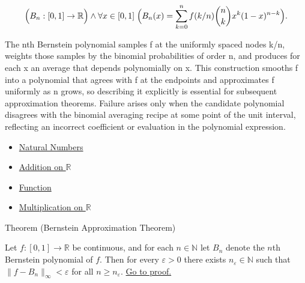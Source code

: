 \begin{remark*}
\[
\Bigl(B_n:[0,1]\to\mathbb{R}\Bigr)\land
\forall x\in[0,1]\;
\Bigl(
B_n(x)=\sum_{k=0}^n f(k/n)\binom{n}{k}x^k(1-x)^{n-k}
\Bigr).
\]
\end{remark*}

\begin{remark*}[Interpretation]
The nth Bernstein polynomial samples f at the uniformly spaced nodes k/n, weights those samples by the binomial probabilities of order n, and produces for each x an average that depends polynomially on x. This construction smooths f into a polynomial that agrees with f at the endpoints and approximates f uniformly as n grows, so describing it explicitly is essential for subsequent approximation theorems. Failure arises only when the candidate polynomial disagrees with the binomial averaging recipe at some point of the unit interval, reflecting an incorrect coefficient or evaluation in the polynomial expression.
\end{remark*}

\begin{dependencies}
\begin{itemize}
  \item \hyperref[def:natural-numbers]{Natural Numbers}
  \item \hyperref[def:addition-on-r]{Addition on $\mathbb{R}$}
  \item \hyperref[def:function]{Function}
  \item \hyperref[def:multiplication-on-r]{Multiplication on $\mathbb{R}$}
\end{itemize}
\end{dependencies}

\begin{theorembox}{Theorem (Bernstein Approximation Theorem)}
\begin{theorem}
\label{thm:bernstein-approximation}
Let $f:[0,1]\to\mathbb{R}$ be continuous, and for each $n\in\mathbb{N}$ let $B_n$ denote the $n$th Bernstein polynomial of $f$. Then for every $\varepsilon>0$ there exists $n_\varepsilon\in\mathbb{N}$ such that $\|f-B_n\|_\infty<\varepsilon$ for all $n\ge n_\varepsilon$. \hyperref[prf:bernstein-approximation]{Go to proof.}
\end{theorem}
\end{theorembox}

